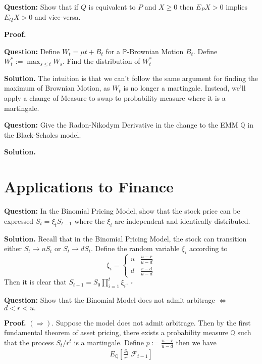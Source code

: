 \documentclass{article}
\begin{document}
\begin{tcolorbox}[colframe=black,colback=gray!5,boxrule=0.5pt]
\textbf{Question:} Show that if $Q$ is equivalent to $P$ and $X\geq0$ then $E_PX > 0 $ implies $E_QX>0$ and vice-versa. 
\end{tcolorbox}
\textbf{Proof.} 



\begin{tcolorbox}[colframe=black,colback=gray!5,boxrule=0.5pt]
\textbf{Question:} Define $W_t = \mu t + B_t$ for a $\mathbb{P}$-Brownian Motion $B_t$. Define $W_t^*:=\max_{s\leq t} W_s$. Find the distribution of $W_t^*$
\end{tcolorbox}
\textbf{Solution.} The intuition is that we can't follow the same argument for finding the maximum of Brownian Motion, as $W_t$ is no longer a martingale. Instead, we'll apply a change of Measure to swap to probability measure where it is a martingale. 


\begin{tcolorbox}[colframe=black,colback=gray!5,boxrule=0.5pt]
\textbf{Question:} Give the Radon-Nikodym Derivative in the change to the EMM $\mathbb{Q}$ in the Black-Scholes model. 
\end{tcolorbox}
\textbf{Solution.} 




\newpage
\section{Applications to Finance}

\begin{tcolorbox}[colframe=black,colback=gray!5,boxrule=0.5pt]
\textbf{Question:} In the Binomial Pricing Model, show that the stock price can be expressed $S_t = \xi_tS_{t-1}$ where the $\xi_i$ are independent and identically distributed.   \cite{Fima}
\end{tcolorbox}
\textbf{Solution.}
Recall that in the Binomial Pricing Model, the stock can transition either $S_{t} \to uS_t$ or $S_t \to dS_t$. Define the random variable $\xi_i$ according to 
\[ \xi_i = \begin{cases} 
      u & \frac{u-r}{u-d} \\
      d & \frac{r-d}{u-d}
   \end{cases}
\]
Then it is clear that $S_{t+1} = S_0\prod_{i=1}^{t}\xi_i$. $\square$

\begin{tcolorbox}[colframe=black,colback=gray!5,boxrule=0.5pt]
\textbf{Question:} Show that the Binomial Model does not admit arbitrage $\iff$ $d<r<u.$
\end{tcolorbox}
\textbf{Proof.}
$(\Rightarrow)$. Suppose the model does not admit arbitrage. Then by the first fundamental theorem of asset pricing, there exists a probability measure $\mathbb{Q}$ such that the process $S_t / r^t$ is a martingale. Define $p:= \frac{u-r}{u-d}$ then we have 
\begin{align*}
    E_\mathbb{Q}\left[\frac{S_t}{r^t} | \mathcal{F}_{t-1}\right]
\end{align*}
 
\end{document}
